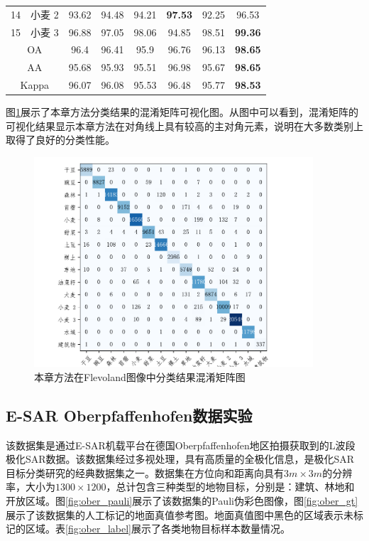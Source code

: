 \begin{table}[ht!]
\begin{tabular}{cccccccc}
        14                        & 小麦 2  & 93.62          & 94.48 & 94.21 & \textbf{97.53} & 92.25          & 96.53          \\
        15                        & 小麦 3  & 96.88          & 97.05 & 98.06 & 94.85          & 98.51          & \textbf{99.36} \\
        \midrule[0.75bp]
        \multicolumn{2}{c}{OA}    & 96.4  & 96.41          & 95.9  & 96.76 & 96.13          & \textbf{98.65}                  \\
        \multicolumn{2}{c}{AA}    & 95.68 & 95.93          & 95.51 & 96.98 & 95.67          & \textbf{98.65}                  \\
        \multicolumn{2}{c}{Kappa} & 96.07 & 96.08          & 95.53 & 96.48 & 95.77          & \textbf{98.53}                  \\
        \bottomrule[1.5bp]
    \end{tabular}
\end{table}


图\ref{fig:fle_conf_matrix}展示了本章方法分类结果的混淆矩阵可视化图。从图中可以看到，混淆矩阵的可视化结果显示本章方法在对角线上具有较高的主对角元素，说明在大多数类别上取得了良好的分类性能。

\begin{figure}[h]
    \centering
    \includegraphics[width=10.4cm]{pic/chapter3/fle/conf-matrix.pdf}
    \caption{本章方法在Flevoland图像中分类结果混淆矩阵图}
    \label{fig:fle_conf_matrix}
\end{figure}


\subsection{E-SAR Oberpfaffenhofen数据实验}
该数据集是通过E-SAR机载平台在德国Oberpfaffenhofen地区拍摄获取到的L波段极化SAR数据。该数据集经过多视处理，具有高质量的全极化信息，是极化SAR目标分类研究的经典数据集之一。数据集在方位向和距离向具有$3m \times 3m$的分辨率，大小为$1300 \times 1200$，总计包含三种类型的地物目标，分别是：建筑、林地和开放区域。图\ref{fig:ober_pauli}展示了该数据集的Pauli伪彩色图像，图\ref{fig:ober_gt}展示了该数据集的人工标记的地面真值参考图。地面真值图中黑色的区域表示未标记的区域。表\ref{fig:ober_label}展示了各类地物目标样本数量情况。

